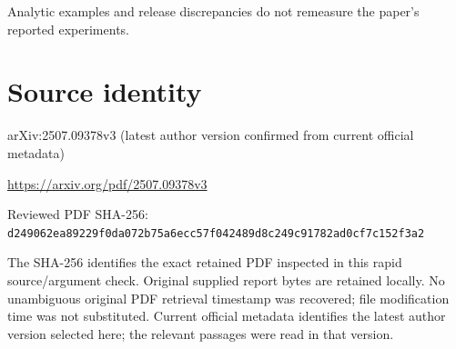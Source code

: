 \documentclass[11pt]{article}
\begin{document}
Analytic examples and release discrepancies do not remeasure the paper’s reported experiments.\par

\section*{Source identity}

arXiv:2507.09378v3 (latest author version confirmed from current official metadata)

\url{https://arxiv.org/pdf/2507.09378v3}

Reviewed PDF SHA-256: \nolinkurl{d249062ea89229f0da072b75a6ecc57f042489d8c249c91782ad0cf7c152f3a2}

The SHA-256 identifies the exact retained PDF inspected in this rapid source/argument check. Original supplied report bytes are retained locally. No unambiguous original PDF retrieval timestamp was recovered; file modification time was not substituted. Current official metadata identifies the latest author version selected here; the relevant passages were read in that version.
\end{document}
